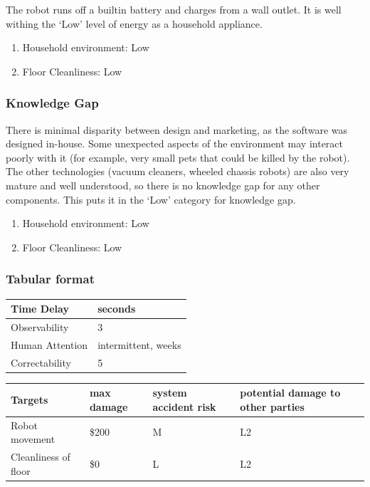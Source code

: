 \documentclass[11pt]{article}
\begin{document}
The robot runs off a builtin battery and charges from a wall outlet. It is well withing the `Low'
level of energy as a household appliance.

\begin{enumerate}
\item Household environment: Low
\item Floor Cleanliness: Low
\end{enumerate}

\subsubsection*{Knowledge Gap}

There is minimal disparity between design and marketing, as the software was designed in-house. Some
unexpected aspects of the environment may interact poorly with it (for example, very small pets that
could be killed by the robot). The other technologies (vacuum cleaners, wheeled chassis robots) are
also very mature and well understood, so there is no knowledge gap for any other components. This
puts it in the `Low' category for knowledge gap.

\begin{enumerate}
\item Household environment: Low
\item Floor Cleanliness: Low
\end{enumerate}


\subsubsection{Tabular format}

\begin{center}
\begin{tabular}{ |l|l| } 
 \hline
 Time Delay & seconds \\
 \hline
 Observability & 3 \\
 \hline
 Human Attention & intermittent, weeks \\
 \hline
 Correctability & 5 \\
 \hline
\end{tabular}
\end{center}

\begin{center}
\begin{tabular}{ |l|l|l|l| } 
 \hline
 Targets & max damage & system accident risk & potential damage to other parties\\
 \hline
 Robot movement & \$200 & M & L2 \\
 Cleanliness of floor & \$0 & L & L2 \\
 \hline
\end{tabular}
\end{center}
\end{document}
